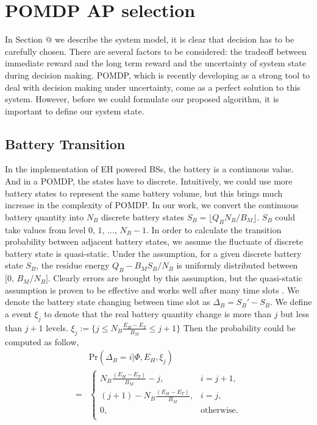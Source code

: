 \documentclass[conference]{IEEEtran}
\makeatletter
\newcommand{\Rmnum}[1]{\expandafter\@slowromancap\romannumeral #1@}
\makeatother
\begin{document}
\section{POMDP AP selection}
In Section \Rmnum{2} we describe the system model, it is clear that decision has to be carefully chosen.
There are several factors to be considered: the tradeoff between immediate reward and the long term reward and
the uncertainty of system state during decision making.
POMDP, which is recently developing as a strong tool to deal with decision making under uncertainty,
come as a perfect solution to this system.
However, before we could formulate our proposed algorithm, it is important to define our system state.
\subsection{Battery Transition}
In the implementation of EH powered BSs, the battery is a continuous value.
And in a POMDP, the states have to discrete.
Intuitively, we could use more battery states to represent the same battery volume,
but this brings much increase in the complexity of POMDP.
In our work, we convert the continuous battery quantity into \(N_B\) discrete battery states
\(S_B = \lfloor Q_B N_B / B_M \rfloor\). \(S_B\) could take values from level \(0,\,1,\,\ldots,\,N_B - 1\).
In order to calculate the transition probability between adjacent battery states,
we assume the fluctuate of discrete battery state is quasi-static.
Under the assumption, for a given discrete battery state \(S_B\),
the residue energy \(Q_B - B_MS_B/N_B\) is uniformly distributed between \(\lbrack0,\,B_M/N_B\rbrack\).
Clearly errors are brought by this assumption,
but the quasi-static assumption is proven to be effective
and works well after many time slots \cite{data}.
We denote the battery state changing between time slot as \(\Delta_B = S_{B}' - S_B\).
We define a event \(\xi_j\) to denote that the real battery quantity change is more than \(j\) but less than \(j+1\) levels.
\(\xi_j := \{j\leq N_B\frac{E_H - E_T}{B_M} \le j+1\}\)
Then the probability could be computed as follow,
\begin{align}&\mbox{Pr}\left(\Delta_B = i |\Phi, E_H, \xi_j \right)\nonumber\\
=&\begin{cases} N_B\frac{\left(E_H - E_T\right)}{B_M} -j, &\mbox{$i = j + 1$},\\
\left(j+1\right) -N_B\frac{\left(E_H - E_T\right)} {B_M}, &\mbox{$i = j$},\\
0, &\mbox{otherwise.}\\
\end{cases}
\end{align}
\end{document}
